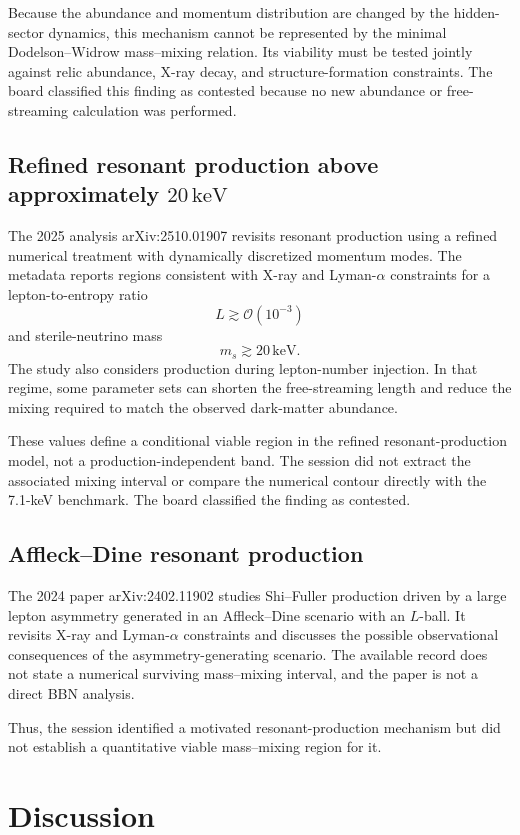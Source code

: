 \documentclass[11pt,a4paper]{article}
\begin{document}
Because the abundance and momentum distribution are changed by the hidden-sector dynamics, this mechanism cannot be represented by the minimal Dodelson--Widrow mass--mixing relation. Its viability must be tested jointly against relic abundance, X-ray decay, and structure-formation constraints. The board classified this finding as contested because no new abundance or free-streaming calculation was performed.

\subsection{Refined resonant production above approximately \(20\,\mathrm{keV}\)}

The 2025 analysis arXiv:2510.01907 revisits resonant production using a refined numerical treatment with dynamically discretized momentum modes. The metadata reports regions consistent with X-ray and Lyman-\(\alpha\) constraints for a lepton-to-entropy ratio
\[
L\gtrsim\mathcal{O}(10^{-3})
\]
and sterile-neutrino mass
\[
m_s\gtrsim20\,\mathrm{keV}.
\]
The study also considers production during lepton-number injection. In that regime, some parameter sets can shorten the free-streaming length and reduce the mixing required to match the observed dark-matter abundance.

These values define a conditional viable region in the refined resonant-production model, not a production-independent band. The session did not extract the associated mixing interval or compare the numerical contour directly with the 7.1-keV benchmark. The board classified the finding as contested.

\subsection{Affleck--Dine resonant production}

The 2024 paper arXiv:2402.11902 studies Shi--Fuller production driven by a large lepton asymmetry generated in an Affleck--Dine scenario with an \(L\)-ball. It revisits X-ray and Lyman-\(\alpha\) constraints and discusses the possible observational consequences of the asymmetry-generating scenario. The available record does not state a numerical surviving mass--mixing interval, and the paper is not a direct BBN analysis.

Thus, the session identified a motivated resonant-production mechanism but did not establish a quantitative viable mass--mixing region for it.

\section{Discussion}
\end{document}
